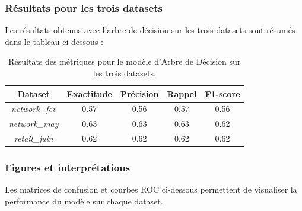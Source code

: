 \subsubsection{Résultats pour les trois datasets}

Les résultats obtenus avec l'arbre de décision sur les trois datasets sont résumés dans le tableau ci-dessous :

\begin{table}[H]
    \centering
    \begin{tabular}{|c|c|c|c|c|}
        \hline
        \textbf{Dataset} & \textbf{Exactitude} & \textbf{Précision} & \textbf{Rappel} & \textbf{F1-score} \\
        \hline
        \textit{network\_fev} & 0.57 & 0.56 & 0.57 & 0.56 \\
        \textit{network\_may} & 0.63 & 0.63 & 0.63 & 0.62 \\
        \textit{retail\_juin} & 0.62 & 0.62 & 0.62 & 0.62 \\
        \hline
    \end{tabular}
    \caption{Résultats des métriques pour le modèle d'Arbre de Décision sur les trois datasets.}
\end{table}
\subsubsection*{Figures et interprétations}

Les matrices de confusion et courbes ROC ci-dessous permettent de visualiser la performance du modèle sur chaque dataset.

